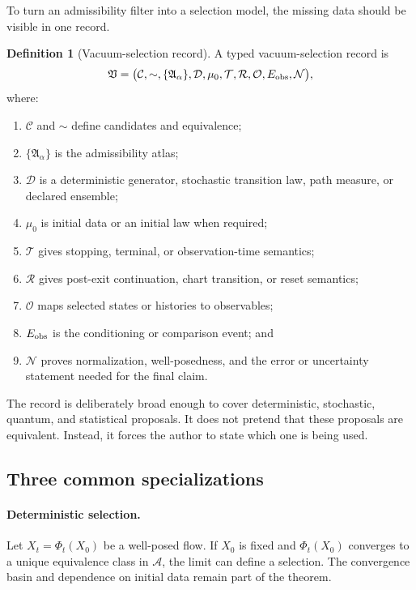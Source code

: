 \documentclass[11pt]{article}
\theoremstyle{definition}
\newtheorem{definition}[theorem]{Definition}
\theoremstyle{remark}
\newcommand{\cA}{\mathcal A}
\newcommand{\cC}{\mathcal C}
\newcommand{\cD}{\mathcal D}
\newcommand{\cN}{\mathcal N}
\newcommand{\cO}{\mathcal O}
\newcommand{\cR}{\mathcal R}
\newcommand{\cT}{\mathcal T}
\newcommand{\1}{\mathbf 1}
\begin{document}
To turn an admissibility filter into a selection model, the missing data
should be visible in one record.

\begin{definition}[Vacuum-selection record]
\label{def:record}
A typed vacuum-selection record is
\[
\mathfrak V=
\bigl(
\cC,\sim,\{\mathfrak A_\alpha\},
\cD,\mu_0,\cT,\cR,
\cO,E_{\rm obs},\cN
\bigr),
\]
where:
\begin{enumerate}[leftmargin=2em]
\item \(\cC\) and \(\sim\) define candidates and equivalence;
\item \(\{\mathfrak A_\alpha\}\) is the admissibility atlas;
\item \(\cD\) is a deterministic generator, stochastic transition law,
      path measure, or declared ensemble;
\item \(\mu_0\) is initial data or an initial law when required;
\item \(\cT\) gives stopping, terminal, or observation-time semantics;
\item \(\cR\) gives post-exit continuation, chart transition, or reset
      semantics;
\item \(\cO\) maps selected states or histories to observables;
\item \(E_{\rm obs}\) is the conditioning or comparison event; and
\item \(\cN\) proves normalization, well-posedness, and the error or
      uncertainty statement needed for the final claim.
\end{enumerate}
\end{definition}

The record is deliberately broad enough to cover deterministic,
stochastic, quantum, and statistical proposals.  It does not pretend that
these proposals are equivalent.  Instead, it forces the author to state
which one is being used.

\subsection{Three common specializations}

\paragraph{Deterministic selection.}
Let \(X_t=\Phi_t(X_0)\) be a well-posed flow.  If \(X_0\) is fixed and
\(\Phi_t(X_0)\) converges to a unique equivalence class in \(\cA\), the
limit can define a selection.  The convergence basin and dependence on
initial data remain part of the theorem.
\end{document}
